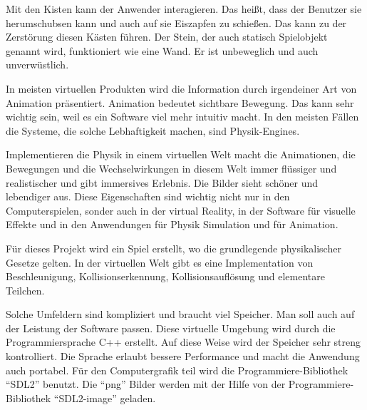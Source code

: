 \documentclass {article}
\begin{document}
\justify
Mit den Kisten kann der Anwender interagieren. Das heißt, dass der Benutzer sie herumschubsen kann und auch auf sie Eiszapfen zu schießen. Das kann zu der Zerstörung diesen Kästen führen. Der Stein, der auch statisch Spielobjekt genannt wird, funktioniert wie eine Wand. Er ist unbeweglich und auch unverwüstlich.

In meisten virtuellen Produkten wird die Information durch irgendeiner Art von Animation präsentiert. Animation bedeutet sichtbare Bewegung. Das kann sehr wichtig sein, weil es ein Software viel mehr intuitiv macht. In den meisten Fällen die Systeme, die solche Lebhaftigkeit machen, sind Physik-Engines.

Implementieren die Physik in einem virtuellen Welt macht die Animationen, die Bewegungen und die Wechselwirkungen in diesem Welt immer flüssiger und realistischer und gibt immersives Erlebnis. Die Bilder sieht schöner und lebendiger aus. Diese Eigenschaften sind wichtig nicht nur in den Computerspielen, sonder auch in der virtual Reality, in der Software für visuelle Effekte und in den Anwendungen für Physik Simulation und für Animation.

Für dieses Projekt wird ein Spiel erstellt, wo die grundlegende physikalischer Gesetze gelten. In der virtuellen Welt gibt es eine Implementation von Beschleunigung, Kollisionserkennung, Kollisionsauflösung und elementare Teilchen.

Solche Umfeldern sind kompliziert und braucht viel Speicher. Man soll auch auf der Leistung der Software passen. Diese virtuelle Umgebung wird durch die Programmiersprache C++ erstellt. Auf diese Weise wird der Speicher sehr streng kontrolliert. Die Sprache erlaubt bessere Performance und macht die Anwendung auch portabel. Für den Computergrafik teil wird die Programmiere-Bibliothek ``SDL2'' benutzt. Die ``png'' Bilder werden mit der Hilfe von der Programmiere-Bibliothek ``SDL2-image'' geladen.

\newpage
\end{document}
